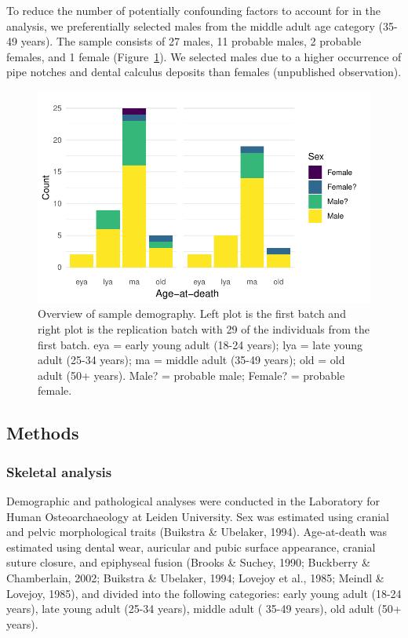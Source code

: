 \documentclass[
]{article}
\begin{document}
To reduce the number of potentially confounding factors to account for
in the analysis, we preferentially selected males from the middle adult
age category (35-49 years). The sample consists of 27 males, 11 probable
males, 2 probable females, and 1 female
(Figure~\ref{fig-sample-demography}). We selected males due to a higher
occurrence of pipe notches and dental calculus deposits than females
(unpublished observation).

\begin{figure}

{\centering \includegraphics{paper_files/figure-pdf/fig-sample-demography-1.pdf}

}

\caption{\label{fig-sample-demography}Overview of sample demography.
Left plot is the first batch and right plot is the replication batch
with 29 of the individuals from the first batch. eya = early young adult
(18-24 years); lya = late young adult (25-34 years); ma = middle adult
(35-49 years); old = old adult (50+ years). Male? = probable male;
Female? = probable female.}

\end{figure}

\hypertarget{methods}{%
\subsection{Methods}\label{methods}}

\hypertarget{skeletal-analysis}{%
\subsubsection{Skeletal analysis}\label{skeletal-analysis}}

Demographic and pathological analyses were conducted in the Laboratory
for Human Osteoarchaeology at Leiden University. Sex was estimated using
cranial and pelvic morphological traits (Buikstra \& Ubelaker, 1994).
Age-at-death was estimated using dental wear, auricular and pubic
surface appearance, cranial suture closure, and epiphyseal fusion
(Brooks \& Suchey, 1990; Buckberry \& Chamberlain, 2002; Buikstra \&
Ubelaker, 1994; Lovejoy et al., 1985; Meindl \& Lovejoy, 1985), and
divided into the following categories: early young adult (18-24 years),
late young adult (25-34 years), middle adult ( 35-49 years), old adult
(50+ years).
\end{document}
